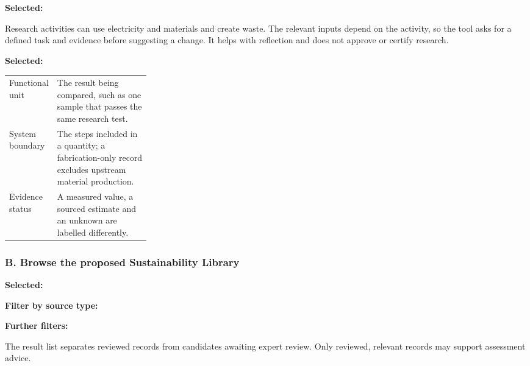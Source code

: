 \documentclass[11pt,a4paper]{article}
\begin{document}
\begin{learnscreen}
\textbf{Selected:} \par
Research activities can use electricity and materials and create waste. The relevant inputs depend on the activity, so the tool asks for a defined task and evidence before suggesting a change. It helps with reflection and does not approve or certify research.\par\medskip
{}\quad
{}\quad
{}
\end{learnscreen}

\begin{learnscreen}
\textbf{Selected:} \par
\begin{tabularx}{\linewidth}{@{}>{\raggedright\arraybackslash}p{0.27\linewidth}X@{}}
Functional unit & The result being compared, such as one sample that passes the same research test. \\
System boundary & The steps included in a quantity; a fabrication-only record excludes upstream material production. \\
Evidence status & A measured value, a sourced estimate and an unknown are labelled differently. \\
\end{tabularx}
\medskip{}\quad
{}\quad
{}
\end{learnscreen}

\pagebreak
\subsubsection*{B. Browse the proposed Sustainability Library}
\begin{learnscreen}
\textbf{Selected:} \par
\textbf{Filter by source type:}\quad
{}\quad
{}\quad
{}\quad
{}\quad
{}\par
\textbf{Further filters:}\quad
{}\quad
{}\quad
{}\quad
{}\par\medskip
The result list separates reviewed records from candidates awaiting expert review. Only reviewed, relevant records may support assessment advice.
\end{learnscreen}
\end{document}
